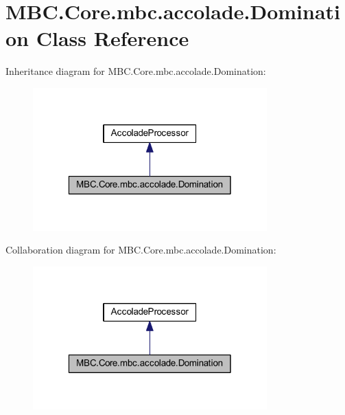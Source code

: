 \hypertarget{class_m_b_c_1_1_core_1_1mbc_1_1accolade_1_1_domination}{\section{M\-B\-C.\-Core.\-mbc.\-accolade.\-Domination Class Reference}
\label{class_m_b_c_1_1_core_1_1mbc_1_1accolade_1_1_domination}
}


Inheritance diagram for M\-B\-C.\-Core.\-mbc.\-accolade.\-Domination\-:\nopagebreak
\begin{figure}[H]
\begin{center}
\leavevmode
\includegraphics[width=256pt]{class_m_b_c_1_1_core_1_1mbc_1_1accolade_1_1_domination__inherit__graph}
\end{center}
\end{figure}


Collaboration diagram for M\-B\-C.\-Core.\-mbc.\-accolade.\-Domination\-:\nopagebreak
\begin{figure}[H]
\begin{center}
\leavevmode
\includegraphics[width=256pt]{class_m_b_c_1_1_core_1_1mbc_1_1accolade_1_1_domination__coll__graph}
\end{center}
\end{figure}
